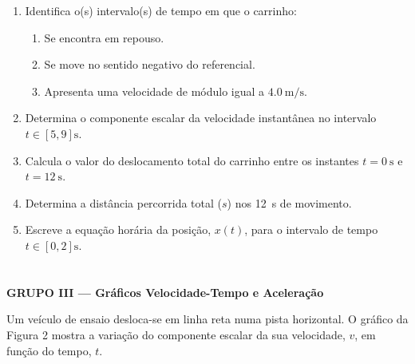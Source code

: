 \documentclass[11pt, a4paper]{article}
\begin{document}
\begin{enumerate}[label=\textbf{2.\arabic*}]
  \item Identifica o(s) intervalo(s) de tempo em que o carrinho:
  \begin{enumerate}[label=\alph*)]
    \item Se encontra em repouso.
    \item Se move no sentido negativo do referencial.
    \item Apresenta uma velocidade de módulo igual a $\SI{4,0}{\meter\per\second}$.
  \end{enumerate}

  \item Determina o componente escalar da velocidade instantânea no intervalo $t \in [5, 9] \unit{\second}$.

  \item Calcula o valor do deslocamento total do carrinho entre os instantes $t = \SI{0}{\second}$ e $t = \SI{12}{\second}$.

  \item Determina a distância percorrida total ($s$) nos \SI{12}{\second} de movimento.

  \item Escreve a equação horária da posição, $x(t)$, para o intervalo de tempo $t \in [0, 2] \unit{\second}$.
\end{enumerate}

\newpage

\section*{}
\begin{center}
  \colorbox{primaryNavy}{\parbox{0.97\textwidth}{\color{white}\bfseries\large GRUPO III --- Gráficos Velocidade-Tempo e Aceleração}}
\end{center}

Um veículo de ensaio desloca-se em linha reta numa pista horizontal. O gráfico da Figura 2 mostra a variação do componente escalar da sua velocidade, $v$, em função do tempo, $t$.
\end{document}
